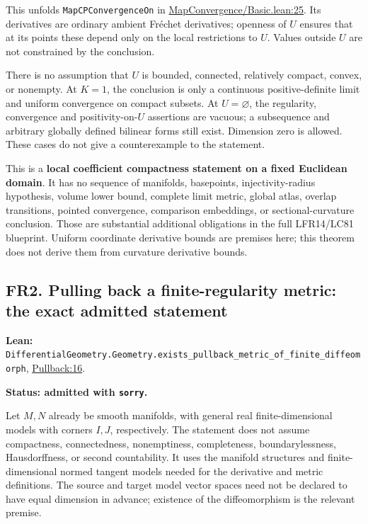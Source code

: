 \documentclass[
  letterpaper,
  11pt]{article}
\begin{document}
This unfolds
{\small\texttt{Map\allowbreak{}CPConvergence\allowbreak{}On}} in
\href{https://github.com/qinz1yang/differential-geometry-dev/blob/ea0fae60ee01ef8c8d9b57a51794c6538f679c5d/DifferentialGeometry/Analysis/Calculus/MapConvergence/Basic.lean\#L25}{MapConvergence/Basic.lean:25}.
Its derivatives are ordinary ambient Fréchet derivatives; openness of
\(U\) ensures that at its points these depend only on the local
restrictions to \(U\). Values outside \(U\) are not constrained by the
conclusion.

There is no assumption that \(U\) is bounded, connected, relatively
compact, convex, or nonempty. At \(K=1\), the conclusion is only a
continuous positive-definite limit and uniform convergence on compact
subsets. At \(U=\varnothing\), the regularity, convergence and
positivity-on-\(U\) assertions are vacuous; a subsequence and arbitrary
globally defined bilinear forms still exist. Dimension zero is allowed.
These cases do not give a counterexample to the statement.

This is a \textbf{local coefficient compactness statement on a fixed
Euclidean domain}. It has no sequence of manifolds, basepoints,
injectivity-radius hypothesis, volume lower bound, complete limit
metric, global atlas, overlap transitions, pointed convergence,
comparison embeddings, or sectional-curvature conclusion. Those are
substantial additional obligations in the full LFR14/LC81 blueprint.
Uniform coordinate derivative bounds are premises here; this theorem
does not derive them from curvature derivative bounds.

\subsection{FR2. Pulling back a finite-regularity metric: the exact
admitted statement}\label{fr2}

\textbf{Lean:}
{\small\texttt{Differential\allowbreak{}Geometry.\allowbreak{}Geometry.\allowbreak{}exists\_\allowbreak{}pullback\_\allowbreak{}metric\_\allowbreak{}of\_\allowbreak{}finite\_\allowbreak{}diffeomorph}},
\href{https://github.com/qinz1yang/differential-geometry-dev/blob/ea0fae60ee01ef8c8d9b57a51794c6538f679c5d/DifferentialGeometry/Geometry/Metric/Pullback/FiniteRegularity.lean\#L16}{Pullback:16}.

\textbf{Status: admitted with {\small\texttt{sorry}}.}

Let \(M,N\) already be smooth manifolds, with general real
finite-dimensional models with corners \(I,J\), respectively. The
statement does not assume compactness, connectedness, nonemptiness,
completeness, boundarylessness, Hausdorffness, or second countability.
It uses the manifold structures and finite-dimensional normed tangent
models needed for the derivative and metric definitions. The source and
target model vector spaces need not be declared to have equal dimension
in advance; existence of the diffeomorphism is the relevant premise.
\end{document}
